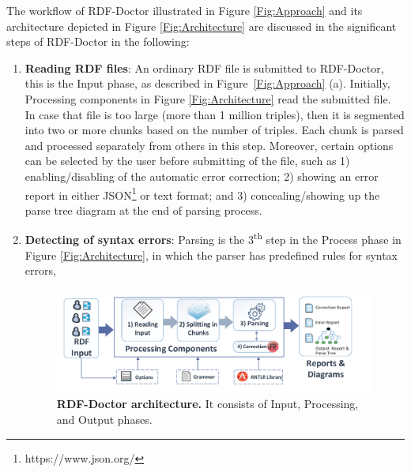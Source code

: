 The workflow of RDF-Doctor illustrated in Figure \ref{Fig:Approach} and its architecture depicted in Figure \ref{Fig:Architecture} are discussed in the significant steps of RDF-Doctor in the following:

 \begin{enumerate}[label=(\alph*)]
\item \textbf{Reading RDF files}: An ordinary RDF file is submitted to RDF-Doctor, this is the Input phase, as described in Figure~\ref{Fig:Approach} (a).
Initially, Processing components in Figure \ref{Fig:Architecture} read the submitted file. In case that file is too large (more than 1 million triples), then it is segmented into two or more chunks based on the number of triples. 
Each chunk is parsed and processed separately from others in this step.
Moreover, certain options can be selected by the user before submitting of the file, such as 1) enabling/disabling of the automatic error correction; 2) showing an error report in either  JSON\footnote{https://www.json.org/} or text format; and 3) concealing/showing up the parse tree diagram at the end of parsing process.
\item \textbf{Detecting of syntax errors}: Parsing is the 3\textsuperscript{th} step in  the Process phase in Figure \ref{Fig:Architecture}, in which the parser has predefined rules for syntax errors,  %
\begin{figure}[ht]
	\begin{center}
		\includegraphics[scale=0.5]{images/architecture.pdf}
	\setlength\belowcaptionskip{-5mm}
		\setlength\abovecaptionskip{-2mm}		\caption{\textbf{RDF-Doctor architecture.} It consists of Input, Processing, and Output phases. 
}
\end{center}
\end{figure}
\end{enumerate}
